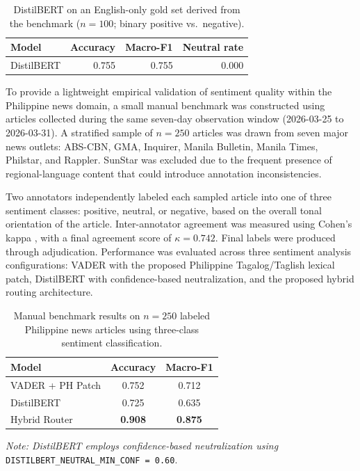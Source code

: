 \documentclass[sigconf, nonacm]{acmart}
\begin{document}
\begin{table}[h]
  \caption{DistilBERT on an English-only gold set derived from the benchmark ($n=100$; binary positive vs.\ negative).}
  \label{tab:distilbert-en-gold}
  \centering
  \small
  \setlength{\tabcolsep}{3.5pt}
  \begin{tabular}{@{}lrrr@{}}
      \toprule
      Model & Accuracy & Macro-F1 & Neutral rate \\
      \midrule
      DistilBERT & 0.755 & 0.755 & 0.000 \\
      \bottomrule
  \end{tabular}
\end{table}

To provide a lightweight empirical validation of sentiment quality within the Philippine news domain, a small manual benchmark was constructed using articles collected during the same seven-day observation window (2026-03-25 to 2026-03-31). A stratified sample of $n=250$ articles was drawn from seven major news outlets: ABS-CBN, GMA, Inquirer, Manila Bulletin, Manila Times, Philstar, and Rappler. SunStar was excluded due to the frequent presence of regional-language content that could introduce annotation inconsistencies.

Two annotators independently labeled each sampled article into one of three sentiment classes: positive, neutral, or negative, based on the overall tonal orientation of the article. Inter-annotator agreement was measured using Cohen’s kappa \cite{cohen1960kappa}, with a final agreement score of $\kappa = 0.742$. Final labels were produced through adjudication. Performance was evaluated across three sentiment analysis configurations: VADER with the proposed Philippine Tagalog/Taglish lexical patch, DistilBERT with confidence-based neutralization, and the proposed hybrid routing architecture.

\begin{table}[h]
\centering
\caption{Manual benchmark results on $n=250$ labeled Philippine news articles using three-class sentiment classification.}
\label{tab:benchmark}

\small
\setlength{\tabcolsep}{6pt}

\begin{tabular}{@{}lcc@{}}
\toprule
\textbf{Model} & \textbf{Accuracy} & \textbf{Macro-F1} \\
\midrule
VADER + PH Patch & 0.752 & 0.712 \\
DistilBERT & 0.725 & 0.635 \\
Hybrid Router & \textbf{0.908} & \textbf{0.875} \\
\bottomrule
\end{tabular}

\vspace{0.4em}

\footnotesize
\textit{Note: DistilBERT employs confidence-based neutralization using}
\texttt{DISTILBERT\_NEUTRAL\_MIN\_CONF = 0.60}.
\end{table}
\end{document}
